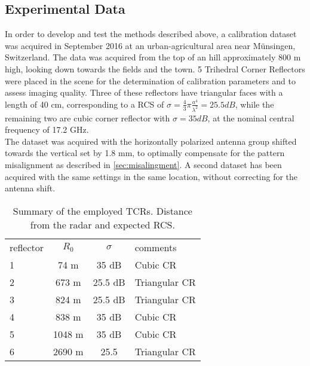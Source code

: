\subsection{Experimental Data}\label{sec:data}
In order to develop and test the methods described above, a calibration dataset was acquired in September 2016 at an urban-agricultural area near M\"{u}nsingen, Switzerland. The data was acquired from the top of an hill approximately 800 m high, looking down towards the fields and the town. 5 Trihedral Corner Reflectors were placed in the scene for the determination of calibration parameters and to assess imaging quality. Three of these reflectors have triangular faces with a length of 40 cm, corresponding to a RCS of $\sigma=\frac{4}{3}\pi \frac{a^4}{\lambda^2}=25.5 dB$, while the remaining two are cubic corner reflector with $\sigma= 35 dB$, at the nominal central frequency of 17.2 GHz.\\
The dataset was acquired with the horizontally polarized antenna group shifted towards the vertical set by 1.8 mm, to optimally compensate for the pattern misalignment as described in \autoref{sec:misalingment}.  A second dataset has been acquired with the same settings in the same location, without correcting for the antenna shift.
\begin{table}[ht]
	\centering
	\begin{tabular}{lccl}
		\hline
		reflector & $R_0$ & $\sigma$ & comments\\
		1 & 74 m & 35 dB &  Cubic CR\\
		2 & 673 m & 25.5 dB &  Triangular CR\\
		3 & 824 m & 25.5 dB & Triangular CR\\
		4 & 838 m & 35 dB & Cubic CR\\
		5 & 1048 m & 35 dB& Cubic CR\\
		6 & 2690 m & 25.5& Triangular CR\\
		\hline
	\end{tabular}
	\caption{Summary of the employed TCRs. Distance from the radar and expected RCS.}
	\label{tab:reflectors}
\end{table}




